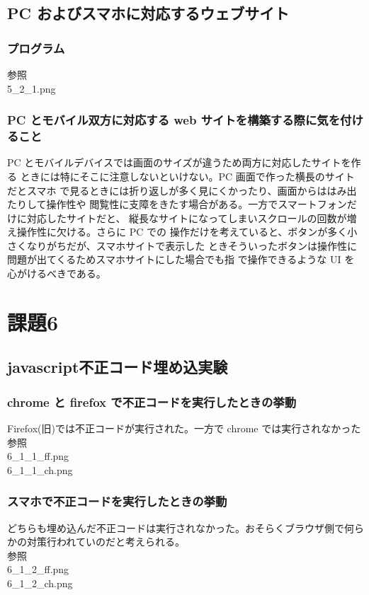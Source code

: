 \documentclass[a4j]{jarticle}
\begin{document}
    \subsection{PC およびスマホに対応するウェブサイト}
      \subsubsection{プログラム}
        参照\\
        5\_2\_1.png
      \subsubsection{PC とモバイル双方に対応する web サイトを構築する際に気を付けること}
            PC とモバイルデバイスでは画面のサイズが違うため両方に対応したサイトを作る
        ときには特にそこに注意しないといけない。PC 画面で作った横長のサイトだとスマホ
        で見るときには折り返しが多く見にくかったり、画面からははみ出たりして操作性や
        閲覧性に支障をきたす場合がある。一方でスマートフォンだけに対応したサイトだと、
        縦長なサイトになってしまいスクロールの回数が増え操作性に欠ける。さらに PC での
        操作だけを考えていると、ボタンが多く小さくなりがちだが、スマホサイトで表示した
        ときそういったボタンは操作性に問題が出てくるためスマホサイトにした場合でも指
        で操作できるような UI を心がけるべきである。
  \section{課題6}
    \subsection{javascript不正コード埋め込実験}
      \subsubsection{chrome と firefox で不正コードを実行したときの挙動}
        Firefox(旧)では不正コードが実行された。一方で chrome では実行されなかった\\
        参照\\
        6\_1\_1\_ff.png\\
        6\_1\_1\_ch.png
      \subsubsection{スマホで不正コードを実行したときの挙動}
        どちらも埋め込んだ不正コードは実行されなかった。おそらくブラウザ側で何らかの対策行われていのだと考えられる。\\
        参照\\
        6\_1\_2\_ff.png\\
        6\_1\_2\_ch.png
\end{document}
